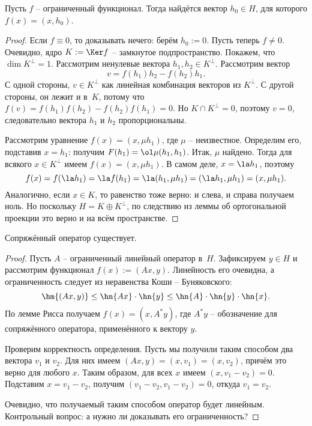 \documentclass[a4paper]{article}
\begin{document}
\begin{lemma}[Рисса]
Пусть $f$ -- ограниченный функционал. Тогда найдётся вектор $h_0 \in H$, для которого $f(x) = (x,h_0)$.
\end{lemma}
\begin{proof}
Если $f \equiv 0$, то доказывать нечего: берём $h_0 := 0$. Пусть теперь $f \neq 0$.
Очевидно, ядро $K := \Ker f$ -- замкнутое подпространство. Покажем, что $\dim K^\bot = 1$.
Рассмотрим ненулевые вектора $h_1, h_2 \in K^\bot$. Рассмотрим вектор
$$v = f(h_1)h_2 - f(h_2)h_1.$$
С одной стороны,
$v \in K^\bot$ как линейная комбинация векторов из $K^\bot$. С другой стороны, он лежит и в~$K$, потому что
$f(v) = f(h_1)f(h_2) - f(h_2)f(h_1) = 0$. Но $K \cap K^\bot = 0$, поэтому $v = 0$, следовательно
вектора $h_1$ и $h_2$ пропорциональны.

Рассмотрим уравнение $f(x) = (x, \mu h_1)$, где $\mu$ -- неизвестное.
Определим его, подставив $x = h_1$: получим $F(h_1) = \ol \mu (h_1,h_1)$. Итак, $\mu$ найдено.
Тогда для всякого $x \in K^\bot$ имеем $f(x) = (x, \mu h_1)$. В самом деле, $x = \la h_1$, поэтому
$$f(x) = f(\la h_1) = \la f(h_1) = \la (h_1,\mu h_1) = (\la h_1,\mu h_1) = (x,\mu h_1).$$
Аналогично, если $x \in K$, то равенство тоже верно: и слева, и справа получаем ноль. Но поскольку $H = K\oplus K^\bot$,
по следствию из леммы об ортогональной проекции это верно и на всём пространстве.
\end{proof}

\begin{stm}
Сопряжённый оператор существует.
\end{stm}
\begin{proof}
Пусть $A$ -- ограниченный линейный оператор в~$H$.
Зафиксируем $y \in H$ и рассмотрим функционал $f(x) := (Ax,y)$. Линейность его очевидна,
а ограниченность следует из неравенства Коши -- Буняковского:
$$\hm{(Ax,y)} \le \hn{Ax}\cdot \hn{y} \le \hn{A}\cdot \hn{y} \cdot \hn{x}.$$
По лемме Рисса получаем $f(x) = (x,A^*y)$, где $A^*y$ -- обозначение для сопряжённого оператора,
применённого к вектору $y$.

Проверим корректность определения. Пусть мы получили таким способом два
вектора $v_1$ и $v_2$. Для них имеем $(Ax,y) = (x,v_1) = (x,v_2)$,
причём это верно для любого $x$. Таким образом, для всех $x$ имеем $(x, v_1 - v_2) = 0$.
Подставим $x = v_1 - v_2$, получим $(v_1-v_2, v_1-v_2) = 0$, откуда $v_1 = v_2$.

Очевидно, что получаемый таким способом оператор будет линейным. Контрольный вопрос:
а нужно ли доказывать его ограниченность?
\end{proof}
\end{document}
